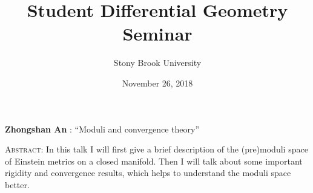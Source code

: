 \documentclass[11pt]{article}
\title{Student Differential Geometry Seminar}
\author{Stony Brook University}
\date{November 26, 2018}
\makeatletter
\newcommand{\spe@ker}{}
\newcommand{\t@lktitle}{}
\newcommand{\@ffili@tion}{}
\newcommand{\speaker}[1]{%
  \renewcommand{\spe@ker}{#1}}
\newcommand{\talktitle}[1]{%
  \renewcommand{\t@lktitle}{#1}}
\newcommand{\affiliation}[1]{%
  \renewcommand{\@ffili@tion}{#1}}
\renewenvironment{abstract}{%
  \begin{center}
    \large
    \textbf{\spe@ker} %
    : ``\t@lktitle''
  \end{center}
  \begin{trivlist}
  \item\textsc{Abstract:}}{%
  \end{trivlist}}
\makeatother
\begin{document}
\maketitle
\thispagestyle{empty}

\speaker{Zhongshan An}
\talktitle{Moduli and convergence theory}

\begin{abstract}
In this talk I will first give a brief description of the (pre)moduli space of Einstein metrics on a closed manifold. Then I will talk about some important rigidity and convergence results, which helps to understand the moduli space better. 
\end{abstract}
\end{document}
